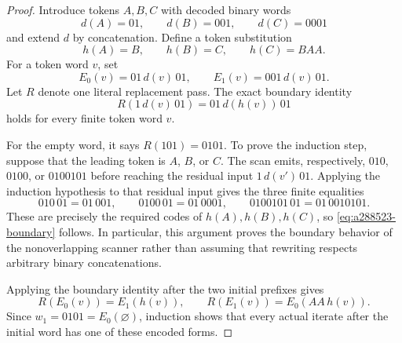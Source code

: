 \documentclass[11pt]{article}
\begin{document}
\begin{proof}
Introduce tokens $A,B,C$ with decoded binary words
\[
 d(A)=01,\qquad d(B)=001,\qquad d(C)=0001
\]
and extend $d$ by concatenation. Define a token substitution
\[
 h(A)=B,\qquad h(B)=C,\qquad h(C)=BAA.
\]
For a token word $v$, set
\[
 E_0(v)=01\,d(v)\,01,\qquad E_1(v)=001\,d(v)\,01.
\]
Let $R$ denote one literal replacement pass. The exact boundary identity
\begin{equation}\label{eq:a288523-boundary}
 R(1\,d(v)\,01)=01\,d(h(v))\,01
\end{equation}
holds for every finite token word $v$.

For the empty word, it says $R(101)=0101$. To prove the induction step,
suppose that the leading token is $A$, $B$, or $C$. The scan emits,
respectively, $010$, $0100$, or $0100101$ before reaching the residual
input $1\,d(v')\,01$. Applying the induction hypothesis to that residual
input gives the three finite equalities
\[
 010\,01=01\,001,\qquad
 0100\,01=01\,0001,\qquad
 0100101\,01=01\,0010101.
\]
These are precisely the required codes of $h(A),h(B),h(C)$, so
\eqref{eq:a288523-boundary} follows. In particular, this argument proves
the boundary behavior of the nonoverlapping scanner rather than
assuming that rewriting respects arbitrary binary concatenations.

Applying the boundary identity after the two initial prefixes gives
\begin{equation}\label{eq:a288523-states}
 R(E_0(v))=E_1(h(v)),\qquad
 R(E_1(v))=E_0(AA\,h(v)).
\end{equation}
Since $w_1=0101=E_0(\varnothing)$, induction shows that every actual
iterate after the initial word has one of these encoded forms.


\end{proof}
\end{document}
